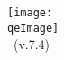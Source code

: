 \begin{center}
\def\version{7.4}
\def\qeImage{../../Doc/quantum_espresso}


  \texttt{[image: \\qeImage]} \\
  
	       \vspace{5.5cm}
  \Huge \intitle\ (v.\version) 
\end{center}
